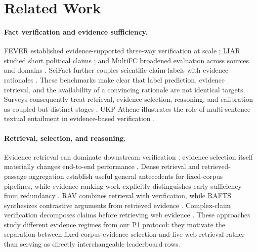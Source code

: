 \documentclass[11pt]{article}
\begin{document}
\section{Related Work}
\paragraph{Fact verification and evidence sufficiency.} FEVER established evidence-supported three-way verification at scale \citep{thorne2018fever}; LIAR studied short political claims \citep{wang2017liar}; and MultiFC broadened evaluation across sources and domains \citep{augenstein2019multifc}. SciFact further couples scientific claim labels with evidence rationales \citep{wadden2020scifact}. These benchmarks make clear that label prediction, evidence retrieval, and the availability of a convincing rationale are not identical targets. Surveys consequently treat retrieval, evidence selection, reasoning, and calibration as coupled but distinct stages \citep{guo2022survey}. UKP-Athene illustrates the role of multi-sentence textual entailment in evidence-based verification \citep{hanselowski2019ukpathene}.

\paragraph{Retrieval, selection, and reasoning.} Evidence retrieval can dominate downstream verification \citep{zheng2024rav}; evidence selection itself materially changes end-to-end performance \citep{samarinas2021quin}. Dense retrieval \citep{karpukhin2020dpr} and retrieved-passage aggregation \citep{izacard2021fid} establish useful general antecedents for fixed-corpus pipelines, while evidence-ranking work explicitly distinguishes early sufficiency from redundancy \citep{alt2026evidence}. RAV combines retrieval with verification, while RAFTS synthesizes contrastive arguments from retrieved evidence \citep{yue2024rafts}. Complex-claim verification decomposes claims before retrieving web evidence \citep{chen2024complex}. These approaches study different evidence regimes from our P1 protocol: they motivate the separation between fixed-corpus evidence selection and live-web retrieval rather than serving as directly interchangeable leaderboard rows.
\end{document}
